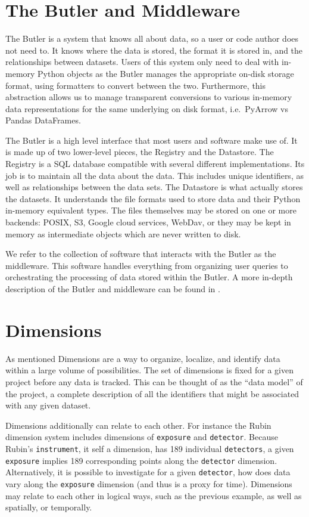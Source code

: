 \documentclass[11pt,twoside]{article}
\begin{document}
\section{The Butler and Middleware}
The Butler is a system that knows all about data, so a user or code author does not need to. It knows where the data is stored, the format it is stored in, and the relationships between datasets. Users of this system only need to deal with in-memory Python objects as the Butler manages the appropriate on-disk storage format, using formatters to convert between the two. Furthermore, this abstraction allows us to manage transparent conversions to various in-memory data representations for the same underlying on disk format, i.e.\ PyArrow vs Pandas DataFrames.

The Butler is a high level interface that most users and software make use of. It is made up of two lower-level pieces, the Registry and the Datastore. The Registry is a SQL database compatible with several different implementations. Its job is to maintain all the data about the data. This includes unique identifiers, as well as relationships between the data sets. The Datastore is what actually stores the datasets. It understands the file formats used to store data and their Python in-memory equivalent types. The files themselves may be stored on one or more backends: POSIX, S3, Google cloud services, WebDav, or they may be kept in memory as intermediate objects which are never written to disk.

We refer to the collection of software that interacts with the Butler as the middleware. This software handles everything from organizing user queries to orchestrating the processing of data stored within the Butler. A more in-depth description of the Butler and middleware can be found in \citet{2022SPIE12189E..11J}.

\section{Dimensions}
As mentioned Dimensions are a way to organize, localize, and identify data within a large volume of possibilities. The set of dimensions is fixed for a given project before any data is tracked. This can be thought of as the ``data model'' of the project, a complete description of all the identifiers that might be associated with any given dataset.

Dimensions additionally can relate to each other. For instance the Rubin dimension system includes dimensions of \texttt{exposure} and \texttt{detector}. Because Rubin's \texttt{instrument}, it self a dimension,  has 189 individual \texttt{detectors}, a given \texttt{exposure} implies 189 corresponding points along the \texttt{detector} dimension. Alternatively, it is possible to investigate for a given \texttt{detector}, how does data vary along the \texttt{exposure} dimension (and thus is a proxy for time). Dimensions may relate to each other in logical ways, such as the previous example, as well as spatially, or temporally.
\end{document}
